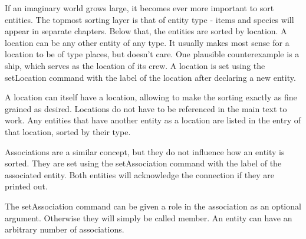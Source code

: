 \documentclass[openany]{book}
\begin{document}
If an imaginary world grows large, it becomes ever more important to sort entities. The topmost sorting layer is that of entity type - items and species will appear in separate chapters. Below that, the entities are sorted by location. A location can be any other entity of any type. It usually makes most sense for a location to be of type places, but \RpgTex{} doesn't care. One plausible counterexample is a ship, which serves as the location of its crew. A location is set using the setLocation command with the label of the location after declaring a new entity.

A location can itself have a location, allowing to make the sorting exactly as fine grained as desired. Locations do not have to be referenced in the main text to work. Any entities that have another entity as a location are listed in the entry of that location, sorted by their type.








Associations are a similar concept, but they do not influence how an entity is sorted. They are set using the setAssociation command with the label of the associated entity. Both entities will acknowledge the connection if they are printed out.

The setAssociation command can be given a role in the association as an optional argument. Otherwise they will simply be called member. An entity can have an arbitrary number of associations.









\automatedChapters{}
\end{document}
